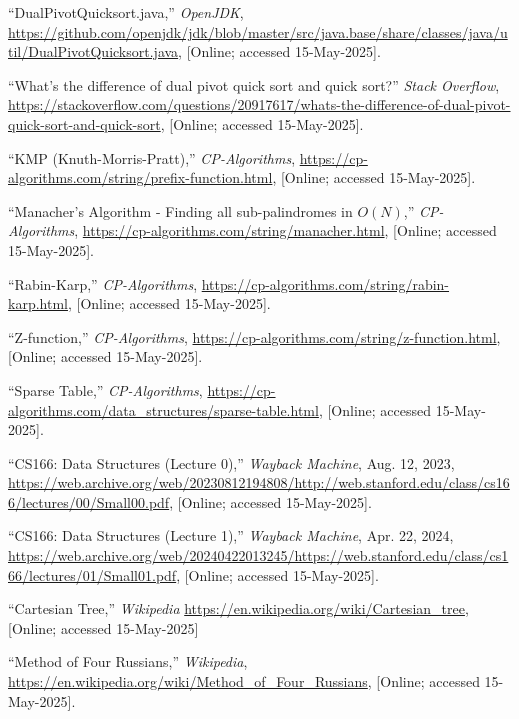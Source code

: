 \documentclass[12pt]{article}
\begin{document}
\begin{thebibliography}{50}
  ``DualPivotQuicksort.java,''
  \emph{OpenJDK},
  \url{https://github.com/openjdk/jdk/blob/master/src/java.base/share/classes/java/util/DualPivotQuicksort.java},
  [Online; accessed 15-May-2025].
  
  ``What's the difference of dual pivot quick sort and quick sort?''
  \emph{Stack Overflow},
  \url{https://stackoverflow.com/questions/20917617/whats-the-difference-of-dual-pivot-quick-sort-and-quick-sort},
  [Online; accessed 15-May-2025].
  
  ``KMP (Knuth-Morris-Pratt),''
  \emph{CP-Algorithms},
  \url{https://cp-algorithms.com/string/prefix-function.html},
  [Online; accessed 15-May-2025].
  
  ``Manacher's Algorithm - Finding all sub-palindromes in $O(N)$,''
  \emph{CP-Algorithms},
  \url{https://cp-algorithms.com/string/manacher.html},
  [Online; accessed 15-May-2025].
  
  ``Rabin-Karp,''
  \emph{CP-Algorithms},
  \url{https://cp-algorithms.com/string/rabin-karp.html},
  [Online; accessed 15-May-2025].
  
  ``Z-function,''
  \emph{CP-Algorithms},
  \url{https://cp-algorithms.com/string/z-function.html},
  [Online; accessed 15-May-2025].
  
  ``Sparse Table,''
  \emph{CP-Algorithms},
  \url{https://cp-algorithms.com/data_structures/sparse-table.html},
  [Online; accessed 15-May-2025].
  
  ``CS166: Data Structures (Lecture 0),''
  \emph{Wayback Machine}, Aug. 12, 2023,
  \url{https://web.archive.org/web/20230812194808/http://web.stanford.edu/class/cs166/lectures/00/Small00.pdf},
  [Online; accessed 15-May-2025].
  
  ``CS166: Data Structures (Lecture 1),''
  \emph{Wayback Machine}, Apr. 22, 2024,
  \url{https://web.archive.org/web/20240422013245/https://web.stanford.edu/class/cs166/lectures/01/Small01.pdf},
  [Online; accessed 15-May-2025].

  ``Cartesian Tree,''
  \emph{Wikipedia}
  \url{https://en.wikipedia.org/wiki/Cartesian_tree},
  [Online; accessed 15-May-2025]
  
  ``Method of Four Russians,''
  \emph{Wikipedia},
  \url{https://en.wikipedia.org/wiki/Method_of_Four_Russians},
  [Online; accessed 15-May-2025].
  

\end{thebibliography}
\end{document}
